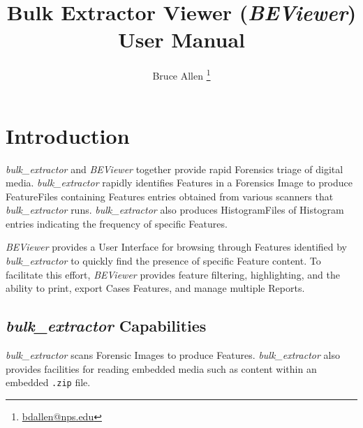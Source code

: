 \documentclass[10pt,twoside]{article}
\newcommand{\bulk}{\emph{bulk\_extractor}\xspace}
\newcommand{\bev}{\emph{BEViewer}\xspace}
\begin{document}

\title{Bulk Extractor Viewer (\bev) User Manual}
\author{Bruce Allen \footnote{\href{mailto:bdallen@nps.edu}{bdallen@nps.edu}}}
\maketitle


\cleardoublepage
\setcounter{tocdepth}{2}
\tableofcontents
\cleardoublepage

\section{Introduction}
\bulk and \bev together provide rapid Forensics triage of digital media.
\bulk rapidly identifies \glspl{Feature} in a Forensics \gls{Image}
to produce \glspl{FeatureFile} containing \glspl{Feature} entries
obtained from various scanners that \bulk runs.
\bulk also produces \glspl{HistogramFile} of \gls{Histogram} entries
indicating the frequency of specific Features.

\bev provides a User Interface for browsing through Features identified by \bulk
to quickly find the presence of specific Feature content.
To facilitate this effort, \bev provides feature filtering, highlighting,
and the ability to print, export \glspl{Case} Features, and manage multiple \glspl{Report}.

\subsection{\bulk Capabilities}
\bulk scans Forensic \glspl{Image} to produce \glspl{Feature}.
\bulk also provides facilities for reading embedded media
such as content within an embedded \texttt{.zip} file.
\end{document}
